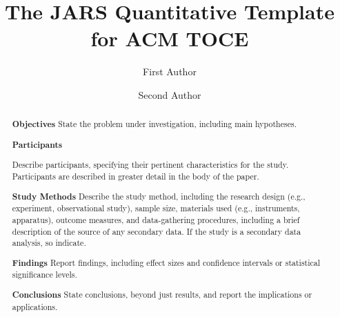 \documentclass[acmsmall,screen,anonymous,review]{acmart}
\begin{document}
\title[JARS Quantitative Template for ACM TOCE]{The JARS Quantitative Template for ACM TOCE}

\author{First Author}

\author{Second Author}

\renewcommand{\shortauthors}{Author et al.}

\newcommand{\AbstractCategory}[1]{%
  \par\addvspace{.5\baselineskip}%
  \noindent\textbf{#1}\quad\ignorespaces
}

%
\begin{abstract}
\AbstractCategory{Objectives}State the problem under investigation, including main hypotheses.


\AbstractCategory{Participants}
Describe participants, specifying their pertinent characteristics for the study. Participants are described in greater detail in the body of the paper.

\AbstractCategory{Study Methods} Describe the study method, including the research design (e.g., experiment, observational study), sample size, materials used (e.g., instruments, apparatus), outcome measures, and data-gathering procedures, including a brief description of the source of any secondary data. If the study is a secondary data analysis, so indicate.

\AbstractCategory{Findings} Report findings, including effect sizes and confidence intervals or statistical significance levels.

\AbstractCategory{Conclusions} State conclusions, beyond just results, and report the implications or applications.

\end{abstract}
\end{document}

